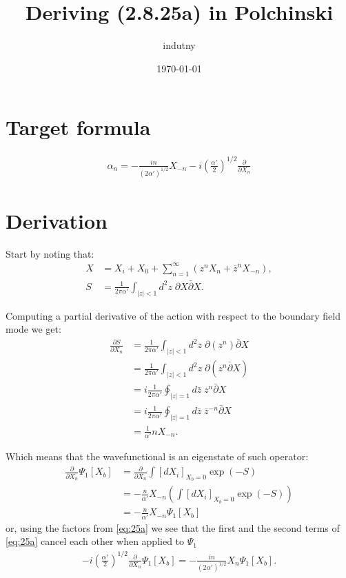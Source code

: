 \documentclass[aps,prd,final,twocolumn,floats,floatfix,nofootinbib,10pt]{revtex4-1}
\begin{document}
\title{Deriving (2.8.25a) in Polchinski}
\author{indutny}
\date{\today}
\noaffiliation

\maketitle

\section{Target formula}

\begin{align}\label{eq:25a}
\alpha_n = - \frac{i n}{(2 \alpha')^{1/2}} X_{-n} - i \left( \frac{\alpha'}{2} \right)^{1/2}
  \frac{\partial}{\partial X_n} \tag{2.8.25a}
\end{align}

\section{Derivation}

Start by noting that:
\begin{align}
X & = X_i + X_0 +
  \sum_{n=1}^\infty \left( z^n X_n + \overline{z}^n X_{-n} \right), \\
S & = \frac{1}{2 \pi \alpha'} \int_{|z| < 1} d^2z \;
  \partial X \bar{\partial} X.
\end{align}

Computing a partial derivative of the action with respect to the boundary field
mode we get:
\begin{align}
\frac{\partial S}{\partial X_n} & = \frac{1}{2 \pi \alpha'} \int_{|z| < 1} d^2z
  \; \partial (z^n) \bar{\partial} X \\
  & = \frac{1}{2 \pi \alpha'} \int_{|z| < 1} d^2z \;
    \partial( z^n \bar{\partial} X) \\
  & = i \frac{1}{2 \pi \alpha'} \oint_{|z| = 1} d\bar{z} \;
    z^n \bar{\partial} X \\
  & = i \frac{1}{2 \pi \alpha'} \oint_{|z| = 1} d\bar{z} \;
    \bar{z}^{-n} \bar{\partial} X \\
  & = \frac{1}{\alpha'} n X_{-n}.
\end{align}

Which means that the wavefunctional is an eigenstate of such operator:
\begin{align}
\frac{\partial}{\partial X_n} \Psi_1[X_b] & =
  \frac{\partial}{\partial X_n} \int [dX_i]_{X_b = 0} \exp(-S) \\
  & = -\frac{n}{\alpha'} X_{-n} \left( \int [dX_i]_{X_b = 0} \exp(-S) \right) \\
  & = -\frac{n}{\alpha'} X_{-n} \Psi_1[X_b]
\end{align}
or, using the factors from \ref{eq:25a} we see that the first and the second
terms of \ref{eq:25a} cancel each other when applied to $\Psi_1$
\begin{align}
-i \left(\frac{\alpha'}{2}\right)^{1/2} \frac{\partial}{\partial X_n}
  \Psi_1[X_b] = -\frac{in}{(2 \alpha')^{1/2}}  X_n \Psi_1[X_b].
\end{align}
\end{document}
